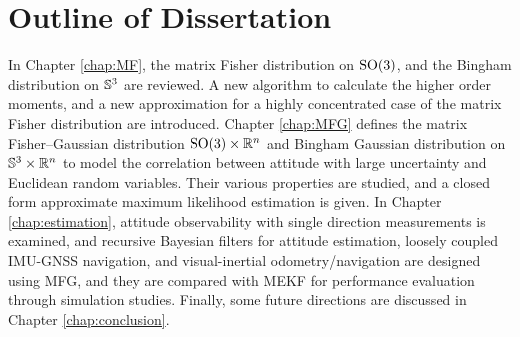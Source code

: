\section{Outline of Dissertation}

In Chapter \ref{chap:MF}, the matrix Fisher distribution on $\mathrm{SO}(3)$, and the Bingham distribution on $\mathbb{S}^3$ are reviewed.
A new algorithm to calculate the higher order moments, and a new approximation for a highly concentrated case of the matrix Fisher distribution are introduced.
Chapter \ref{chap:MFG} defines the matrix Fisher--Gaussian distribution $\mathrm{SO}(3) \times \mathbb{R}^n$ and Bingham Gaussian distribution on $\mathbb{S}^3\times\mathbb{R}^n$ to model the correlation between attitude with large uncertainty and Euclidean random variables.
Their various properties are studied, and a closed form approximate maximum likelihood estimation is given.
In Chapter \ref{chap:estimation}, attitude observability with single direction measurements is examined, and recursive Bayesian filters for attitude estimation, loosely coupled IMU-GNSS navigation, and visual-inertial odometry/navigation are designed using MFG, and they are compared with MEKF for performance evaluation through simulation studies.
Finally, some future directions are discussed in Chapter \ref{chap:conclusion}.
